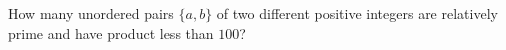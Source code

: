 How many unordered pairs $\{a,b\}$ of two different positive integers are relatively prime and have product less than $100$?
